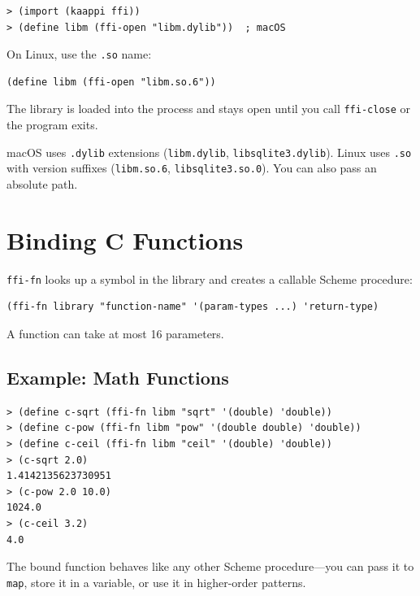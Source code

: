 \begin{lstlisting}[style=repl]
> (import (kaappi ffi))
> (define libm (ffi-open "libm.dylib"))  ; macOS
\end{lstlisting}

On Linux, use the \texttt{.so} name:

\begin{lstlisting}
(define libm (ffi-open "libm.so.6"))
\end{lstlisting}

The library is loaded into the process and stays open until you call \texttt{ffi-close} or the program exits.

\begin{note}
macOS uses \texttt{.dylib} extensions (\texttt{libm.dylib}, \texttt{libsqlite3.dylib}). Linux uses \texttt{.so} with version suffixes (\texttt{libm.so.6}, \texttt{libsqlite3.so.0}). You can also pass an absolute path.
\end{note}

\section{Binding C Functions}

\texttt{ffi-fn} looks up a symbol in the library and creates a callable Scheme procedure:

\begin{lstlisting}
(ffi-fn library "function-name" '(param-types ...) 'return-type)
\end{lstlisting}

A function can take at most 16 parameters.

\subsection{Example: Math Functions}

\begin{lstlisting}[style=repl]
> (define c-sqrt (ffi-fn libm "sqrt" '(double) 'double))
> (define c-pow (ffi-fn libm "pow" '(double double) 'double))
> (define c-ceil (ffi-fn libm "ceil" '(double) 'double))
> (c-sqrt 2.0)
1.4142135623730951
> (c-pow 2.0 10.0)
1024.0
> (c-ceil 3.2)
4.0
\end{lstlisting}

The bound function behaves like any other Scheme procedure---you can pass it to \texttt{map}, store it in a variable, or use it in higher-order patterns.

